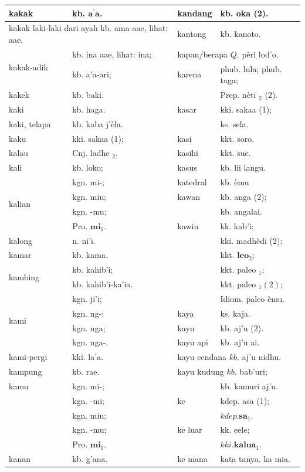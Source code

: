 \documentclass[10pt]{article}
\begin{document}
\begin{center}
\begin{tabular}{|l|l|l|l|}
\hline
kakak & kb. \(\boldsymbol{a}^{\prime} \boldsymbol{a}\). & kandang & kb. oka (2). \\
\hline
\multicolumn{2}{|l|}{kakak laki-laki dari ayah kb. ama aae, lihat: aae.} & kantong & kb. kanoto. \\
\hline
\multirow{2}{*}{kakak-adik} & kb. ina aae, lihat: ina; & \multicolumn{2}{|l|}{kapan/berapa \(Q\). pèri lod'o.} \\
\hline
 & kb. a'a-ari; & karena & phub. lula; phub. taga; \\
\hline
kakek & kb. baki. &  & Prep. nèti \({ }_{2}\) (2). \\
\hline
kaki & kb. haga. & kasar & kki. sakaa (1); \\
\hline
kaki, telapa & kb. kaba j'èla. &  & ks. sela. \\
\hline
kaku & kki. sakaa (1); & kasi & kkt. soro. \\
\hline
kalau & Cnj. ladhe \({ }_{2}\). & kasihi & kkt. sue. \\
\hline
kali & kb. loko; & kasus & kb. lii langu. \\
\hline
\multirow[t]{4}{*}{kalian} & kgn. mi-; & katedral & kb. èmu \\
\hline
 & kgn. miu; & kawan & kb. anga (2); \\
\hline
 & kgn. -mu; &  & kb. angalai. \\
\hline
 & Pro. \(\mathbf{m i}_{1}\). & kawin & kk. kab'i; \\
\hline
kalong & n. ni'i. &  & kki. madhèdi (2); \\
\hline
kamar & kb. kama. &  & kkt. \(\mathbf{l e o}_{2}\); \\
\hline
\multirow[t]{2}{*}{kambing} & kb. kahib'i; &  & kkt. paleo \(_{1}\); \\
\hline
 & kb. kahib'i-ka'ia. &  & kkt. paleo \({ }_{1}(2) ;\) \\
\hline
\multirow[t]{4}{*}{kami} & kgn. ji'i; &  & Idiom. paleo èmu. \\
\hline
 & kgn. ng-; & kaya & ks. kaja. \\
\hline
 & kgn. nga; & kayu & kb. aj'u (2). \\
\hline
 & kgn. nga-. & kayu api & kb. aj'u ai. \\
\hline
kami-pergi & kki. la'a. & \multicolumn{2}{|l|}{kayu cendana \(k b\). aj'u nidhu.} \\
\hline
kampung & kb. rae. & \multicolumn{2}{|l|}{kayu kudung \(k b\). bab'uri;} \\
\hline
kamu & kgn. mi-; &  & kb. kamuri aj'u. \\
\hline
 & kgn. -mi; & ke & kdep. asa (1); \\
\hline
 & kgn. miu; &  & \(k d e p . \mathbf{s a}_{1}\). \\
\hline
 & kgn. -mu; & ke luar & kk. eele; \\
\hline
 & Pro. \(\mathbf{m i}_{1}\). &  & \(k k i . \mathbf{k a l u a}_{1}\). \\
\hline
kanan & kb. g'ana. & ke mana & kata tanya. ka mia. \\
\hline
\end{tabular}
\end{center}
\end{document}

